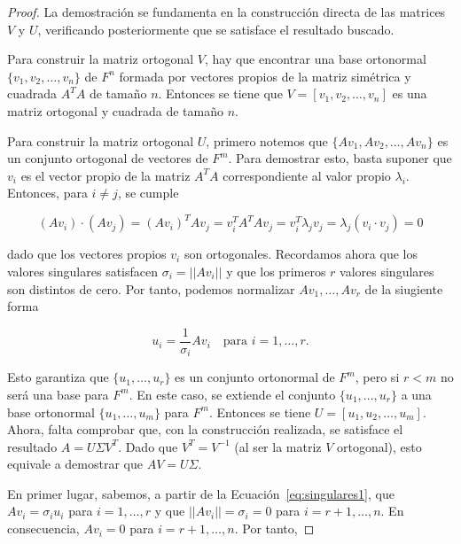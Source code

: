 \begin{proof}
    La demostración se fundamenta en la construcción directa de las matrices $V$ y $U$, verificando posteriormente que se satisface el resultado buscado.\newline

    Para construir la matriz ortogonal $V$, hay que encontrar una base ortonormal $\{v_1, v_2, \ldots, v_n \}$ de $F^{n}$ formada por vectores propios de la matriz simétrica y cuadrada $A^{T}A$ de tamaño $n$. Entonces se tiene que $V = [v_1, v_2, \ldots, v_n]$ es una matriz ortogonal y cuadrada de tamaño $n$.\newline

    Para construir la matriz ortogonal $U$, primero notemos que $\{Av_1, Av_2, \ldots, Av_n \}$ es un conjunto ortogonal de vectores de $F^{m}$. Para demostrar esto, basta suponer que $v_i$ es el vector propio de la matriz $A^{T}A$ correspondiente al valor propio $\lambda_i$. Entonces, para $i \neq j$, se cumple

    \[ (Av_i)\cdot(Av_j) = (Av_i)^{T}Av_j=v_{i}^{T}A^{T}Av_j = v_{i}^{T}\lambda_j v_j=\lambda_j(v_i \cdot v_j) = 0\]

    dado que los vectores propios $v_i$ son ortogonales. Recordamos ahora que los valores singulares satisfacen $\sigma_i = ||Av_i||$ y que los primeros $r$ valores singulares son distintos de cero. Por tanto, podemos normalizar $Av_1, \ldots, Av_r$ de la siugiente forma

    \begin{equation}
        u_i = \frac{1}{\sigma_i} A v_i \quad \text{para } i = 1, \ldots, r.
        \label{eq:singulares1}
    \end{equation}
    

    Esto garantiza que $\{ u_1, \ldots, u_r\}$ es un conjunto ortonormal de $F^{m}$, pero si $r < m$ no será una base para $F^{m}$. En este caso, se extiende el conjunto $\{u_1, \ldots, u_r \}$ a una base ortonormal $\{u_1, \ldots, u_m \}$ para $F^{m}$. Entonces se tiene $U = [u_1, u_2, \ldots, u_m]$. Ahora, falta comprobar que, con la construcción realizada, se satisface el resultado $A = U \Sigma V^{T}$. Dado que $V^{T} = V^{-1}$ (al ser la matriz $V$ ortogonal), esto equivale a demostrar que $AV = U\Sigma$.\newline

    En primer lugar, sabemos, a partir de la Ecuación~\eqref{eq:singulares1}, que $Av_i=\sigma_i u_i$ para $i=1, \ldots, r$ y que $||A v_i|| = \sigma_i = 0$ para $i=r+1, \ldots,n$. En consecuencia, $Av_i = 0$ para $i=r+1, \ldots,n$. Por tanto, \newline


\end{proof}
